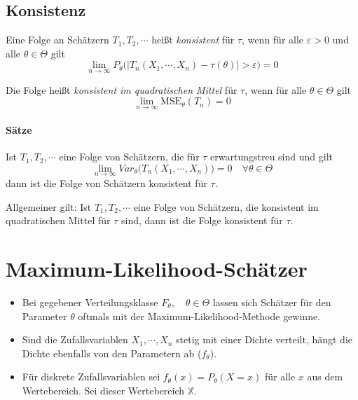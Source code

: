 \documentclass[a4paper, 11pt, accentcolor = tud3b]{tudreport}
\newcommand{\abs}[1]{\ensuremath{{\lvert #1 \rvert}}}
\newcommand{\Var}{\ensuremath{\textit{Var}}}
\newcommand{\MSE}{\ensuremath{\textrm{MSE}}}
\begin{document}
            \subsection{Konsistenz}
                Eine Folge an Schätzern \( T_1, T_2, \cdots \) heißt \textit{konsistent} für \(\tau\), wenn für alle \(\varepsilon > 0\) und alle \(\theta \in \Theta\) gilt
                \begin{equation*}
	                \lim\limits_{n \rightarrow \infty} P_\theta\big( \abs{T_n(X_1, \cdots, X_n) - \tau(\theta)} > \varepsilon \big) = 0
                \end{equation*}
                
                Die Folge heißt \textit{konsistent im quadratischen Mittel} für \(\tau\), wenn für alle \(\theta \in \Theta\) gilt
                \begin{equation*}
	                \lim\limits_{n \rightarrow \infty} \MSE_\theta(T_n) = 0
                \end{equation*}
                
	            \paragraph{Sätze}
	                Ist \(T_1, T_2, \cdots\) eine Folge von Schätzern, die für \(\tau\) erwartungstreu sind und gilt
	                \begin{equation*}
		                \lim\limits_{n \rightarrow \infty} \Var_\theta\big(T_n(X_1, \cdots, X_n)\big) = 0 \quad \forall \theta \in \Theta
	                \end{equation*}
	                dann ist die Folge von Schätzern konsistent für \(\tau\).
	                
	                Allgemeiner gilt: Ist \( T_1, T_2, \cdots \) eine Folge von Schätzern, die konsistent im quadratischen Mittel für \(\tau\) sind, dann ist die Folge konsistent für \(\tau\).

        \section{Maximum-Likelihood-Schätzer}
            \begin{itemize}
            	\item Bei gegebener Verteilungsklasse \( F_\theta, \quad \theta \in \Theta \) lassen sich Schätzer für den Parameter \(\theta\) oftmals mit der Maximum-Likelihood-Methode gewinne.
            	\item Sind die Zufallsvariablen \( X_1, \cdots, X_n \) stetig mit einer Dichte verteilt, hängt die Dichte ebenfalls von den Parametern ab (\(f_\theta\)).
            	\item Für diskrete Zufallsvariablen sei \( f_\theta(x) = P_\theta(X = x) \) für alle \(x\) aus dem Wertebereich. Sei dieser Wertebereich \(\mathbb{X}\).
            \end{itemize}
        
\end{document}
